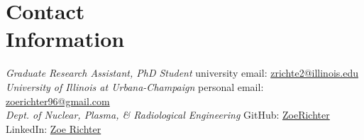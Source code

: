   \section{\mysidestyle Contact\\Information}
  \textsl{Graduate Research Assistant, PhD Student}
  \hfill university email: \href{mailto:zrichte2@illinois.edu}{zrichte2@illinois.edu}\\
  \textsl{University of Illinois at Urbana-Champaign}
  \hfill personal email: \href{mailto:zoerichter96@gmail.com}{zoerichter96@gmail.com}\\
  \textsl{Dept. of Nuclear, Plasma, \& Radiological Engineering}
  \hfill GitHub: \href{https://github.com/ZoeRichter}{\faGithub ZoeRichter}\\
  \vspace{0mm} \hfill LinkedIn: \href{https://www.linkedin.com/in/zoe-richter-2b3a17382/}{\faLinkedin Zoe Richter}


